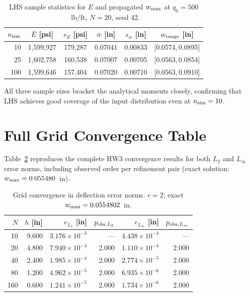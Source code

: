 \documentclass[10pt,twocolumn]{article}
\begin{document}
\begin{table}[h!]
\centering
\caption{LHS sample statistics for $E$ and propagated $w_{\rm max}$
  at $q_0=500$~lb/ft, $N=20$, seed 42.}
\label{tab:lhs}
\footnotesize
\setlength{\tabcolsep}{3pt}
\begin{tabular}{@{}rccccc@{}}
\toprule
$n_{\rm sim}$ & $\bar{E}$ [psi] & $s_E$ [psi] &
  $\bar{w}$ [in] & $s_w$ [in] & $w_{\rm range}$ [in]\\
\midrule
  10 & 1,599,927 & 179,287 & 0.07041 & 0.00833 & [0.0574,\,0.0895]\\
  25 & 1,602,758 & 160,538 & 0.07007 & 0.00705 & [0.0563,\,0.0854]\\
 100 & 1,599,646 & 157,404 & 0.07020 & 0.00710 & [0.0563,\,0.0910]\\
\bottomrule
\end{tabular}
\end{table}

All three sample sizes bracket the analytical moments closely,
confirming that LHS achieves good coverage of the input distribution
even at $n_{\rm sim}=10$.

\section{Full Grid Convergence Table}
\label{app:conv}

Table~\ref{tab:conv_full} reproduces the complete HW3 convergence results
for both $L_2$ and $L_\infty$ error norms, including observed order
per refinement pair (exact solution: $w_{\rm max}=0.055480$~in).

\begin{table}[h!]
\centering
\caption{Grid convergence in deflection error norms.
  $r=2$; exact $w_{{\rm max}}=0.0554802$~in.}
\label{tab:conv_full}
\footnotesize
\setlength{\tabcolsep}{3pt}
\begin{tabular}{@{}rrrrrr@{}}
\toprule
$N$ & $h$ [in] & $e_{L_2}$ [in] & $p_{{\rm obs},L_2}$ & $e_{L_\infty}$ [in] & $p_{{\rm obs},L_\infty}$\\
\midrule
 10 & 9.600 & $3.176{\times}10^{-3}$ & ---   & $4.438{\times}10^{-4}$ & ---  \\
 20 & 4.800 & $7.940{\times}10^{-4}$ & 2.000 & $1.110{\times}10^{-4}$ & 2.000\\
 40 & 2.400 & $1.985{\times}10^{-4}$ & 2.000 & $2.774{\times}10^{-5}$ & 2.000\\
 80 & 1.200 & $4.962{\times}10^{-5}$ & 2.000 & $6.935{\times}10^{-6}$ & 2.000\\
160 & 0.600 & $1.241{\times}10^{-5}$ & 2.000 & $1.734{\times}10^{-6}$ & 2.000\\
\bottomrule
\end{tabular}
\end{table}
\end{document}
